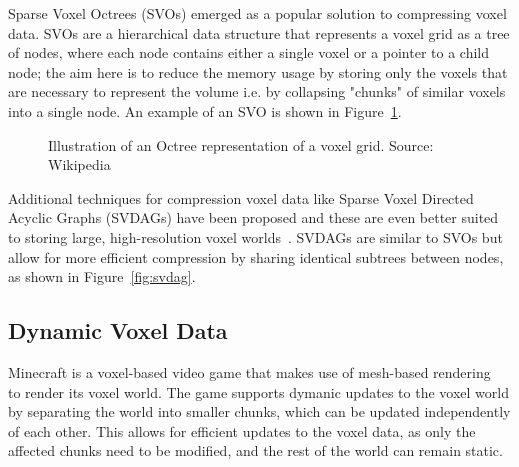 \documentclass{article}
\begin{document}
Sparse Voxel Octrees (SVOs) emerged as a popular solution to compressing voxel data. SVOs are a hierarchical data structure that represents a voxel grid as a tree of nodes, where each node contains either a single voxel or a pointer to a child node; the aim here is to reduce the memory usage by storing only the voxels that are necessary to represent the volume i.e. by collapsing "chunks" of similar voxels into a single node. An example of an SVO is shown in Figure~\ref{fig:svo}.

\begin{figure}[thp]
    \begin{center}
    \end{center}
    \caption{Illustration of an Octree representation of a voxel grid. Source: Wikipedia}
    \label{fig:svo}
\end{figure}

Additional techniques for compression voxel data like Sparse Voxel Directed Acyclic Graphs (SVDAGs) have been proposed and these are even better suited to storing large, high-resolution voxel worlds~\cite{Kampe_Sintorn_Assarsson}. SVDAGs are similar to SVOs but allow for more efficient compression by sharing identical subtrees between nodes, as shown in Figure~\ref{fig:svdag}.

\subsection{Dynamic Voxel Data}
Minecraft is a voxel-based video game that makes use of mesh-based rendering~\label{Mesh-based Rendering} to render its voxel world. The game supports dymanic updates to the voxel world by separating the world into smaller chunks, which can be updated independently of each other. This allows for efficient updates to the voxel data, as only the affected chunks need to be modified, and the rest of the world can remain static.
\end{document}
